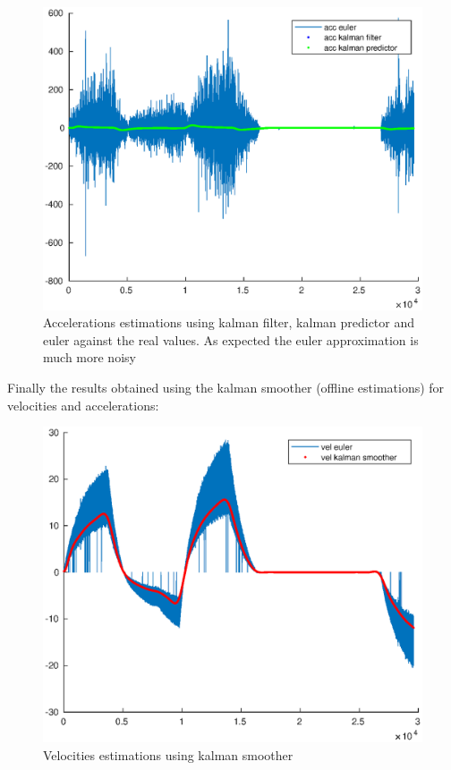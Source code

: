 \documentclass[a4paper,12pt]{article}
\begin{document}
\begin{figure}[H]
    \begin{center}
        \includegraphics[scale=0.7]{images/acc.eps}
    \end{center}
    \caption{Accelerations estimations using kalman filter, kalman predictor and euler against the real values. As expected the euler approximation is much more noisy}
    \label{fig:hw3_acc}
\end{figure}

\noindent Finally the results obtained using the kalman smoother (offline estimations) for velocities and accelerations:
\begin{figure}[H]
    \begin{center}
        \includegraphics[scale=0.7]{images/vel_sm.eps}
    \end{center}
    \caption{Velocities estimations using kalman smoother}
    \label{fig:vel_sm}
\end{figure}
\end{document}
